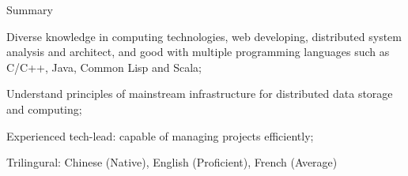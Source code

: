 \documentclass{resume} %
\begin{document}
\begin{rSection}{Summary}

\item Diverse knowledge in computing technologies, web developing, distributed system analysis and architect,
 and good with multiple programming languages such as C/C++, Java, Common Lisp and Scala;
\item Understand principles of mainstream infrastructure for distributed data storage and computing;
\item Experienced tech-lead: capable of managing projects efficiently;
\item Trilingural: Chinese (Native), English (Proficient), French (Average)
\end{rSection}





\end{document}
